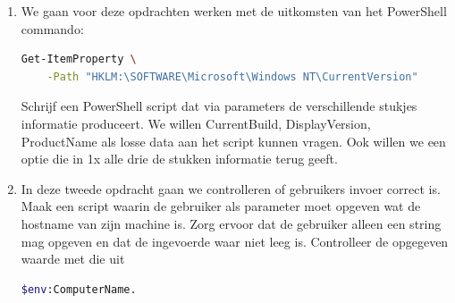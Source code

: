 
\begin{enumerate}
\item We gaan voor deze opdrachten werken met de uitkomsten van het PowerShell commando:
\begin{lstlisting}[language=bash]
Get-ItemProperty \
    -Path "HKLM:\SOFTWARE\Microsoft\Windows NT\CurrentVersion"
\end{lstlisting}
 Schrijf een PowerShell script dat via parameters de verschillende stukjes informatie produceert. We willen CurrentBuild, DisplayVersion, ProductName als losse data aan het script kunnen vragen. Ook willen we een optie die in 1x alle drie de stukken informatie terug geeft.
\item In deze tweede opdracht gaan we controlleren of gebruikers invoer correct is. Maak een script waarin de gebruiker als parameter moet opgeven wat de hostname van zijn machine is. Zorg ervoor dat de gebruiker alleen een string mag opgeven en dat de ingevoerde waar niet leeg is. Controlleer de opgegeven waarde met die uit 
\begin{lstlisting}[language=bash]
$env:ComputerName.
\end{lstlisting}
\end{enumerate}

